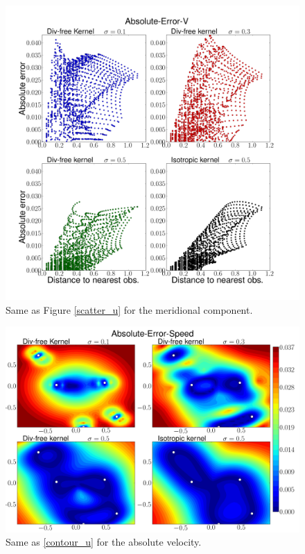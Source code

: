 \documentclass[12pt,a4paper]{article}%
\begin{document}
\begin{figure}
\noindent\includegraphics[width=36pc]{plots/Absolute-Error-V-scatter.png}
\caption{Same as Figure \ref{scatter_u} for the meridional component.  }
\label{scatter_v}
\end{figure}

\begin{figure}
\noindent\includegraphics[width=36pc]{plots/Absolute-Error-Speed-contour.png}
\caption{Same as \ref{contour_u} for the absolute velocity. }
\label{contour_speed}
\end{figure}
\end{document}
